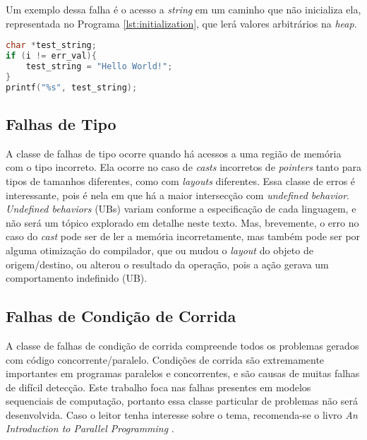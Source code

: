 Um exemplo dessa falha é o acesso a \emph{string} em um caminho que não inicializa ela, representada no Programa \ref{lst:initialization}, que lerá valores arbitrários na \emph{heap}.

\begin{lstlisting}[language=C, label={lst:initialization}, caption=Exemplo de uma Falha de Inicalização com \emph{Strings}]
char *test_string;
if (i != err_val){
	test_string = "Hello World!";
}
printf("%s", test_string);
\end{lstlisting}


\subsection{Falhas de Tipo}

A classe de falhas de tipo ocorre quando há acessos a uma região de memória com o tipo incorreto. Ela ocorre no caso de \emph{casts} incorretos de \emph{pointers} tanto para tipos de tamanhos diferentes, como com \emph{layouts} diferentes. Essa classe de erros é interessante, pois é nela em que há a maior intersecção com \emph{undefined behavior}. \emph{Undefined behaviors} (UBs) variam conforme a especificação de cada linguagem, e não será um tópico explorado em detalhe neste texto. Mas, brevemente, o erro no caso do \emph{cast} pode ser de ler a memória incorretamente, mas também pode ser por alguma otimização do compilador, que ou mudou o \emph{layout} do objeto de origem/destino, ou alterou o resultado da operação, pois a ação gerava um comportamento indefinido (UB).

\subsection{Falhas de Condição de Corrida}

A classe de falhas de condição de corrida compreende todos os problemas gerados com código concorrente/paralelo. Condições de corrida são extremamente importantes em programas paralelos e concorrentes, e são causas de muitas falhas de difícil detecção. Este trabalho foca nas falhas presentes em modelos sequenciais de computação, portanto essa classe particular de problemas não será desenvolvida. Caso o leitor tenha interesse sobre o tema, recomenda-se o livro \emph{An Introduction to Parallel Programming}  \cite{pacheco2011}.
